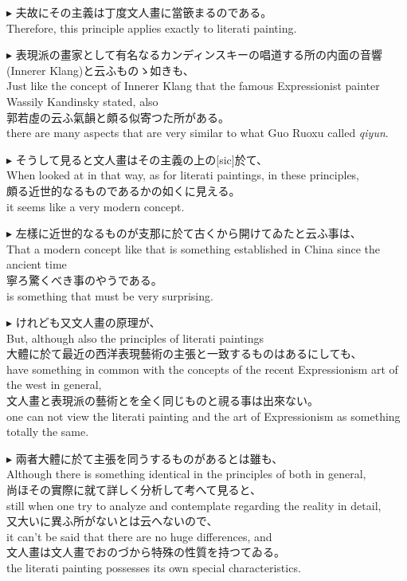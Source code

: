 \documentclass{ctexart}
\makeatletter
\newcommand*{\shifttext}[1]{%
  \settowidth{\@tempdima}{#1}%
  \hspace{-\@tempdima}#1%
}
\newcommand{\plabel}[1]{%
\shifttext{\textbf{#1}\quad}%
}
\makeatother
\begin{document}
\vspace{1em}
\plabel{$\blacktriangleright$}%
夫故にその主義は丁度文人畫に當篏まるのである。\\
Therefore, this principle applies exactly to literati painting.

\vspace{1em}
\plabel{$\blacktriangleright$}%
表現派の畫家として有名なるカンディンスキーの唱道する所の内面の音響(Innerer Klang)と云ふものゝ如きも、\\
Just like the concept of Innerer Klang that the famous Expressionist painter Wassily Kandinsky stated, also\\
郭若虛の云ふ氣韻と頗る似寄つた所がある。\\
there are many aspects that are very similar to what Guo Ruoxu called \textit{qiyun}.

\vspace{1em}
\plabel{$\blacktriangleright$}%
そうして見ると文人畫はその主義の上の{\small\relax{}[sic]}於て、\\
When looked at in that way, as for literati paintings, in these principles,\\
頗る近世的なるものであるかの如くに見える。\\
it seems like a very modern concept.

\vspace{1em}
\plabel{$\blacktriangleright$}%
左樣に近世的なるものが支那に於て古くから開けてゐたと云ふ事は、\\
That a modern concept like that is something established in China since the ancient time\\
寧ろ驚くべき事のやうである。\\
is something that must be very surprising.

\vspace{1em}
\plabel{$\blacktriangleright$}%
けれども又文人畫の原理が、\\
But, although also the principles of literati paintings\\
大體に於て最近の西洋表現藝術の主張と一致するものはあるにしても、\\
have something in common with the concepts of the recent Expressionism art of the west in general,\\
文人畫と表現派の藝術とを全く同じものと視る事は出來ない。\\
one can not view the literati painting and the art of Expressionism as something totally the same.

\vspace{1em}
\plabel{$\blacktriangleright$}%
兩者大體に於て主張を同うするものがあるとは雖も、\\
Although there is something identical in the principles of both in general,\\
尚ほその實際に就て詳しく分析して考へて見ると、\\
still when one try to analyze and contemplate regarding the reality in detail,\\
又大いに異ふ所がないとは云へないので、\\
it can't be said that there are no huge differences, and\\
文人畫は文人畫でおのづから特殊の性質を持つてゐる。\\
the literati painting possesses its own special characteristics.
\end{document}
